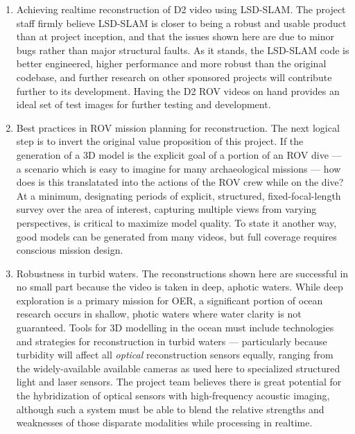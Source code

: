 \documentclass[letterpaper,12pt]{article}
\begin{document}
\begin{enumerate}
    \item Achieving realtime reconstruction of D2 video using LSD-SLAM.   The project staff firmly believe LSD-SLAM is closer to being a robust and usable product than at project inception, and that the issues shown here are due to minor bugs rather than major structural faults.   As it stands, the LSD-SLAM code is better engineered, higher performance and more robust than the original codebase, and further research on other sponsored projects will contribute further to its development.   Having the D2 ROV videos on hand provides an ideal set of test images for further testing and development.
    
    \item Best practices in ROV mission planning for reconstruction.   The next logical step is to invert the original value proposition of this project.   If the generation of a 3D model is the explicit goal of a portion of an ROV dive --- a scenario which is easy to imagine for many archaeological missions --- how does is this translatated into the actions of the ROV crew while on the dive?   At a minimum, designating periods of explicit, structured, fixed-focal-length survey over the area of interest, capturing multiple views from varying perspectives, is critical to maximize model quality.  To state it another way, good models can be generated from many videos, but full coverage requires conscious mission design.
    
    \item Robustness in turbid waters.  The reconstructions shown here are successful in no small part because the video is taken in deep, aphotic waters.   While deep exploration is a primary mission for OER, a significant portion of ocean research occurs in shallow, photic waters where water clarity is not guaranteed.   Tools for 3D modelling in the ocean must include technologies and strategies for reconstruction in turbid waters --- particularly because turbidity will affect all \textit{optical} reconstruction sensors equally, ranging from the widely-available available cameras as used here to specialized structured light and laser sensors.   The project team believes there is great potential for the hybridization of optical sensors with high-frequency acoustic imaging, although such a system must be able to blend the relative strengths and weaknesses of those disparate modalities while processing in realtime. 
\end{enumerate}


\end{document}
